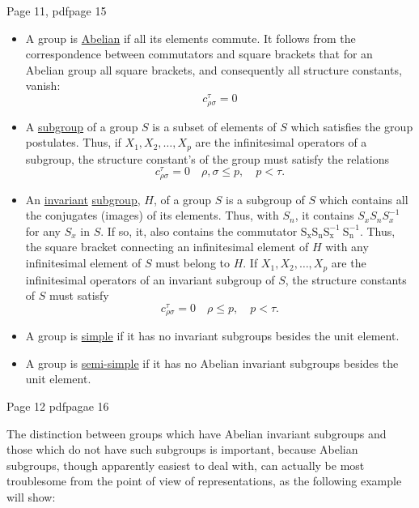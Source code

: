 Page 11, pdfpage 15
\begin{itemize}
\item[a)]
A group is
\underline{Abelian} if all its elements commute. It follows from the correspondence
between commutators and square brackets that for an Abelian group all
square brackets, and consequently all structure constants, vanish:
\begin{equation}\label{eq:20}
c^{\tau}_{\rho \sigma} =0
\end{equation}
\item[b)]
A
\underline{subgroup} of a group \(S\) is a subset of elements of \(S\) which
satisfies the group postulates. Thus, if \(X_1, X_2, \ldots, X_p\) are the
infinitesimal operators of a subgroup, the structure constant's of the
group must satisfy the relations
\begin{equation}\label{eq:21}
c_{\rho \sigma}^\tau=0 \quad \rho, \sigma \leq p, \quad p < \tau.
\end{equation}
\item[c)]
An \underline{invariant} \underline{subgroup}, \(H\), of a group \(S\) is
a subgroup of \(S\) which contains all the
conjugates (images) of its elements. Thus, with \(S_n\), it contains \(S_x
S_n S_x^{-1}\) for any \(S_x\) in \(S\). If so, it, also contains the
commutator \(\mathrm{S}_{\mathrm{x}} \mathrm{S}_{\mathrm{n}}
\mathrm{S}_{\mathrm{x}}^{-1} \mathrm{~S}_{\mathrm{n}}^{-1}\). Thus, the
square bracket connecting an infinitesimal element of \(H\) with any
infinitesimal element of \(S\) must belong to \(H\). If \(X_1, X_2,
\ldots, X_p\) are the infinitesimal operators of an invariant subgroup of
\(S\), the structure constants of \(S\) must satisfy
\begin{equation}\label{eq:22}
c_{\rho \sigma}^\tau=0 \quad \rho \leq p, \quad p < \tau.
\end{equation}
\item[d)]
A group is \underline{simple}
if it has no invariant subgroups besides the unit element.
\item[e)] A group is \underline{semi-simple}
if it has no Abelian invariant subgroups besides the
unit element.
\end{itemize}
Page 12 pdfpagae 16

The distinction between groups which have Abelian invariant subgroups and
those which do not have such subgroups is important, because Abelian
subgroups, though apparently easiest to deal with, can actually be most
troublesome from the point of view of representations, as the following
example will show:

